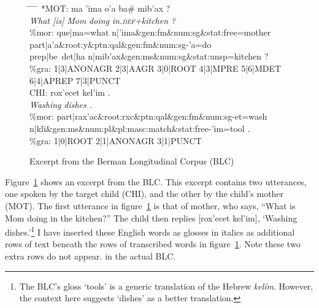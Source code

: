 \begin{figure}[t]
\begin{mdframed}
\begin{tabbing}
\hspace{0.6in} \= \hspace{0.6in} \=  \hspace{0.5in} \= \hspace{0.6in} \= \hspace{3.4in} \kill
\textsf{*MOT:} \> \textsf{ma} \> \textsf{\a'{i}ma} \> \textsf{o\a'{a}} \>  \textsf{ba\# mib\a'{a}x ?} \\
\> \textit{What [is]} \> \textit{Mom} \> \textit{doing} \> \textit{in.\textsc{def}+kitchen ?} \\[6pt]
\textsf{\%mor:} \> \textsf{que|ma=what n|\a'{i}ma\&gen:fm\&num:sg\&stat:free=mother} \\
 \> \textsf{part|a\a'{a}\&root:y\&ptn:qal\&gen:fm\&num:sg-\a'{a}=do} \\
   \> \textsf{prep|be~det|ha n|mib\a'{a}x\&gen:ms\&num:sg\&stat:unsp=kitchen ?}\\[6pt]
\textsf{\%gra:} \>	\textsf{1|3|ANONAGR 2|3|AAGR 3|0|ROOT 4|3|MPRE 5|6|MDET 6|4|APREP 7|3|PUNCT}\\[6pt]
\textsf{CHI:} \> \textsf{rox\a'{e}cet} \> \textsf{kel\a'{i}m .}\\
		\> \textit{Washing} \> \textit{dishes .}  \\[6pt]
\textsf{\%mor:} \> \textsf{part|rax\a'{a}c\&root:rxc\&ptn:qal\&gen:fm\&num:sg-et=wash} \\
    \>  \textsf{n|kli}\&\textsf{gen:ms\&num:pl\&pl:masc:match\&stat:free-\a'{i}m=tool .} \\[6pt]
\textsf{\%gra:} \> \textsf{1|0|ROOT 2|1|ANONAGR 3|1|PUNCT}
\end{tabbing}
\caption{Excerpt from the Berman Longitudinal Corpus (BLC)}
\label{fig:excerpt}
\end{mdframed}
\end{figure}
Figure~\ref{fig:excerpt} shows an excerpt from the BLC. 
This excerpt contains two utterances, one spoken by the 
target child (CHI), and the other by the child's mother (MOT).
The first utterance in figure~\ref{fig:excerpt} is that of mother,
who says, ``What is Mom doing in the kitchen?'' The child
then replies \textsf{[rox\a'{e}cet kel\a'{i}m]}, `Washing dishes.'\footnote{The BLC's gloss `tools' is a generic translation of the Hebrew \textit{kel\'{i}m}. However, the context here suggests `dishes'
as a better translation.}
I have inserted these English words as glosses in italics as additional 
rows of text beneath the rows of transcribed words in figure~\ref{fig:excerpt}. 
Note these two extra rows do not appear. 
in the actual BLC.

